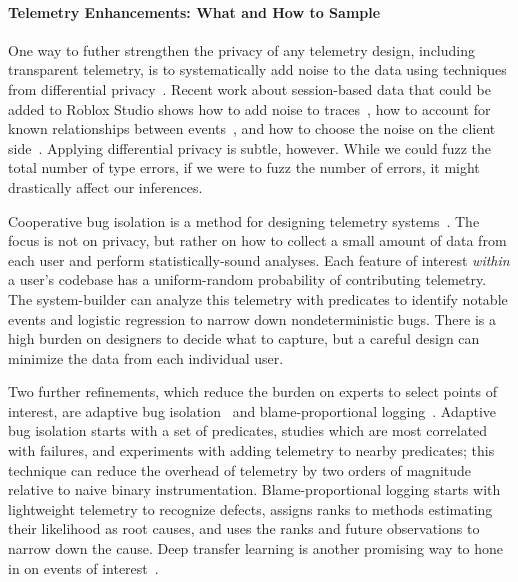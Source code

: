 \documentclass[english,submission,cleveref]{programming}
\begin{document}
\paragraph{Telemetry Enhancements: What and How to Sample}

One way to futher strengthen the privacy of any telemetry design, including
transparent telemetry, is to systematically add noise to the data using
techniques from differential
privacy~\cite{epk-ccs-2014,wblj-usenix-2017,zhlbr-cc-2020}.
Recent work about session-based data that could be added
to Roblox Studio shows how to add noise to traces~\cite{zhlbr-cc-2020},
how to account for known relationships between events~\cite{zhlbr-oopsla-2020},
and how to choose the noise on the client side~\cite{hlzbr-ecoop-2021}.
Applying differential privacy is subtle, however.
While we could fuzz the total number of type errors, if we were to
fuzz the number of  errors, it might drastically
affect our inferences.

Cooperative bug isolation is a method for designing
telemetry systems~\cite{liblit-thesis}.
The focus is not on privacy, but rather on how to collect a small amount of
data from each user and perform statistically-sound analyses.
Each feature of interest \emph{within} a user's codebase has a uniform-random
probability of contributing telemetry.
The system-builder can analyze this telemetry with predicates to identify
notable events and logistic regression to narrow down nondeterministic bugs.
There is a high burden on designers to decide what to capture,
but a careful design can minimize the data from each individual user.

Two further refinements, which reduce the burden on experts to
select points of interest, are adaptive bug isolation~\cite{nl-icse-2010}
and blame-proportional logging~\cite{lnsmc-usenix-2018}.
Adaptive bug isolation starts with a set of predicates, studies which are
most correlated with failures, and experiments with adding telemetry to nearby
predicates; this technique can reduce the overhead of telemetry by two orders
of magnitude relative to naive binary instrumentation.
Blame-proportional logging starts with lightweight telemetry to recognize
defects, assigns ranks to methods estimating their likelihood as root causes,
and uses the ranks and future observations to narrow down the cause.
Deep transfer learning is another promising way to hone in on events of
interest~\cite{zfstt-ieeesensors-2022}.
\end{document}
